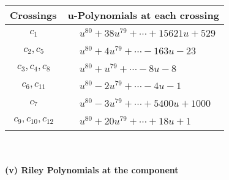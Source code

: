 \documentclass[1p]{elsarticle_modified}
\theoremstyle{definition}
\begin{document}
\begin{tabular}{m{50pt}|m{274pt}}
Crossings & \hspace{64pt}u-Polynomials at each crossing \\
\hline $$\begin{aligned}c_{1}\end{aligned}$$&$\begin{aligned}
&u^{80}+38 u^{79}+\cdots+15621 u+529
\end{aligned}$\\
\hline $$\begin{aligned}c_{2},c_{5}\end{aligned}$$&$\begin{aligned}
&u^{80}+4 u^{79}+\cdots-163 u-23
\end{aligned}$\\
\hline $$\begin{aligned}c_{3},c_{4},c_{8}\end{aligned}$$&$\begin{aligned}
&u^{80}+u^{79}+\cdots-8 u-8
\end{aligned}$\\
\hline $$\begin{aligned}c_{6},c_{11}\end{aligned}$$&$\begin{aligned}
&u^{80}-2 u^{79}+\cdots-4 u-1
\end{aligned}$\\
\hline $$\begin{aligned}c_{7}\end{aligned}$$&$\begin{aligned}
&u^{80}-3 u^{79}+\cdots+5400 u+1000
\end{aligned}$\\
\hline $$\begin{aligned}c_{9},c_{10},c_{12}\end{aligned}$$&$\begin{aligned}
&u^{80}+20 u^{79}+\cdots+18 u+1
\end{aligned}$\\
\hline
\end{tabular}\\~\\
\newpage\renewcommand{\arraystretch}{1}
\flushleft \textbf{(v) Riley Polynomials at the component}\newline \\
\end{document}
